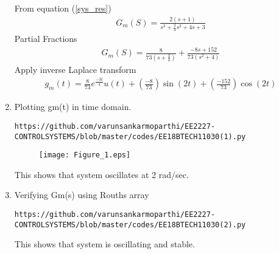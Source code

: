 \begin{enumerate}[label=\thesection.\arabic*.,ref=\thesection.\theenumi]
\solution
From equation (\ref{sys_res})
\begin{align}
 G_{m}(S) = \frac{2(s+1)}{s^3+\frac{3}{4}s^2+4s+3} 
\end{align}
Partial Fractions
\begin{align}
 G_{m}(S) = \frac{8}{73(s+\frac{3}{4})}+ \frac{-8s+152}{73(s^2+4)}
\end{align}
Apply inverse Laplace transform
\begin{align}
 g_{m}(t) = \frac{8}{73}e^{\frac{-3t}{4}}u(t)+ (\frac{-8}{73})\sin(2t) +(\frac{-152}{73})\cos(2t)
\end{align}



\item Plotting gm(t) in time domain.
\begin{lstlisting}
https://github.com/varunsankarmoparthi/EE2227-CONTROLSYSTEMS/blob/master/codes/EE18BTECH11030(1).py
\end{lstlisting}
\begin{figure}[!h]
  \texttt{[image: Figure\_1.eps]}
 
\end{figure}

This shows that system oscillates at 2 rad/sec.
\item Verifying Gm(s) using Rouths array
\begin{lstlisting}
https://github.com/varunsankarmoparthi/EE2227-CONTROLSYSTEMS/blob/master/codes/EE18BTECH11030(2).py
\end{lstlisting}
This shows that system is oscillating and stable.
\end{enumerate}
